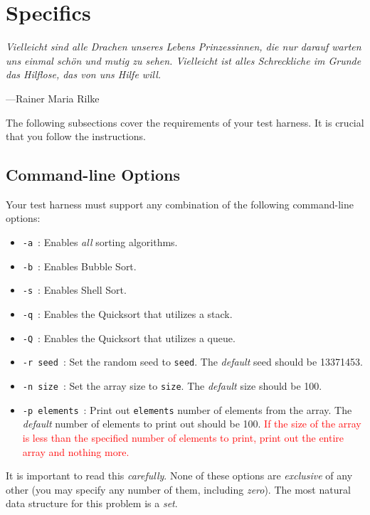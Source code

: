 \section{Specifics}

\epigraph{\emph{Vielleicht sind alle Drachen unseres Lebens
  Prinzessinnen, die nur darauf warten uns einmal sch\"on und mutig zu
sehen. Vielleicht ist alles Schreckliche im Grunde das Hilflose, das von
uns Hilfe will.}}{---Rainer Maria Rilke}

\noindent The following subsections cover the requirements of your test harness.
It is crucial that you follow the instructions.

\subsection{Command-line Options}

Your test harness must support any combination of the following
command-line options:

\begin{itemize}
  \item \texttt{-a}\ : Enables \emph{all} sorting algorithms.
  \item \texttt{-b}\ : Enables Bubble Sort.
  \item \texttt{-s}\ : Enables Shell Sort.
  \item \texttt{-q}\ : Enables the Quicksort that utilizes a stack.
  \item \texttt{-Q}\ : Enables the Quicksort that utilizes a queue.
  \item \texttt{-r seed}\ : Set the random seed to \texttt{seed}.
    The \emph{default} seed should be 13371453.
  \item \texttt{-n size}\ : Set the array size to \texttt{size}. The
    \emph{default} size should be 100.
  \item \texttt{-p elements}\ : Print out \texttt{elements} number of
    elements from the array. The \emph{default} number of elements to
    print out should be 100. \textcolor{red}{If the size of the array is
      less than the specified number of elements to print, print out the
    entire array and nothing more.}
\end{itemize}

It is important to read this \emph{carefully}. None of these options are
\emph{exclusive} of any other (you may specify any number of them,
including \emph{zero}). The most natural data structure for this
problem is a \emph{set}.
